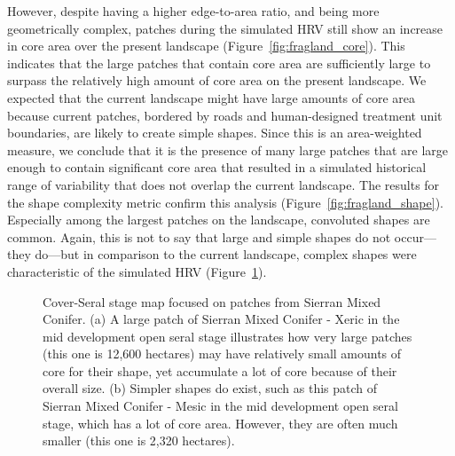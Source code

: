 However, despite having a higher edge-to-area ratio, and being more geometrically complex, patches during the simulated HRV still show an increase in core area over the present landscape (Figure~\ref{fig:fragland_core}). This indicates that the large patches that contain core area are sufficiently large to surpass the relatively high amount of core area on the present landscape. We expected that the current landscape might have large amounts of core area because current patches, bordered by roads and human-designed treatment unit boundaries, are likely to create simple shapes. Since this is an area-weighted measure, we conclude that it is the presence of many large patches that are large enough to contain significant core area that resulted in a simulated historical range of variability that does not overlap the current landscape. The results for the shape complexity metric confirm this analysis (Figure~\ref{fig:fragland_shape}). Especially among the largest patches on the landscape, convoluted shapes are common. Again, this is not to say that large and simple shapes do not occur---they do---but in comparison to the current landscape, complex shapes were characteristic of the simulated HRV (Figure~\ref{fig:patchmaps4}).

\begin{figure}[!htbp]
  \centering
  \caption{Cover-Seral stage map focused on patches from Sierran Mixed Conifer. (a) A large patch of Sierran Mixed Conifer - Xeric in the mid development open seral stage illustrates how very large patches (this one is 12,600 hectares) may have relatively small amounts of core for their shape, yet accumulate a lot of core because of their overall size. (b) Simpler shapes do exist, such as this patch of Sierran Mixed Conifer - Mesic in the mid development open seral stage, which has a lot of core area. However, they are often much smaller (this one is 2,320 hectares).}
  \label{fig:patchmaps4}
\end{figure}

